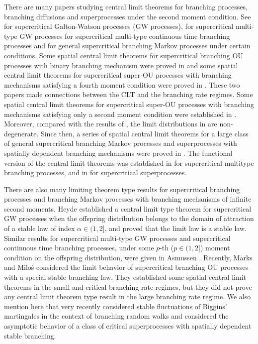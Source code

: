 \documentclass[12pt,a4paper]{amsart}
\theoremstyle{plain}
\theoremstyle{definition}
\numberwithin{equation}{section}
\begin{document}
There are many papers studying central limit theorems for branching processes, branching diffusions and superprocesses under the second moment condition.
See \cite{Heyde1970A-rate, HeydeBrown1871An-invariance, HeydeLeslie1971Improved} for supercritical Galton-Watson processes (GW processes), \cite{KestenStigum1966Additional,KestenStigum1966A-limit} for supercritical multi-type GW processes \cite{Athreya1969Limit,Athreya1969LimitB,Athreya1971Some} for supercritical multi-type continuous time branching processes and \cite{AsmussenHering1983Branching} for general supercritical branching Markov processes under certain conditions.
Some spatial central limit theorems for   supercritical branching OU processes with binary branching mechanism were proved in \cite{AdamczakMilos2015CLT} and some spatial central limit theorems for supercritical super-OU processes with branching mechanisms satisfying a fourth moment condition were proved in \cite{Milos2012Spatial}.
These two papers made connections between the CLT and  the branching rate regimes.
Some spatial central limit theorems for supercritical super-OU  processes with branching mechanisms satisfying only a second moment condition were established in \cite{RenSongZhang2014Central}.
Moreover, compared with the results of \cite{AdamczakMilos2015CLT,Milos2012Spatial}, the limit distributions in \cite{RenSongZhang2014Central} are non-degenerate.
Since then, a series of spatial central limit theorems for a large class of general supercritical branching Markov processes and superprocesses with spatially dependent branching mechanisms were proved in \cite{RenSongZhang2014CentralB,RenSongZhang2015Central,RenSongZhang2017Central}.
The functional version of the central limit theorems was established in \cite{Janson2004Functional} for supercritical multitype branching processes, and  in \cite{RenSongZhang2017Functional} for supercritical superprocesses.

There are also many limiting theorem type results for supercritical branching processes and branching Markov processes with branching mechanisms of infinite second moments.
Heyde \cite{Heyde1971Some} established a central limit type  theorem for supercritical GW processes when the offspring distribution belongs to the domain of attraction of a stable law of index $\alpha\in (1, 2]$, and proved that the limit law is  a stable law. 
Similar results  for supercritical multi-type GW processes and supercritical  continuous time branching processes, 
under some $p$-th ($p\in(1,2]$) moment condition on the offspring distribution, were given in Asmussen \cite{Asmussen76Convergence}.
Recently, Marks and Milo\'s \cite{MarksMilos2018CLT} considered the limit behavior of supercritical branching OU processes with a special stable branching law.
They established some spatial central limit theorems in the small and critical branching rate regimes, but they did not prove any central limit theorem type result in the large branching rate regime.
We also mention here that very recently \cite{IksanovKoleskoMeiners2018Stable-like} considered stable fluctuations of Biggins' martingales in the context of branching random walks and \cite{RenSongSun2018Limit} considered the asymptotic behavior of a class of critical superprocesses with spatially dependent stable branching.
\end{document}
